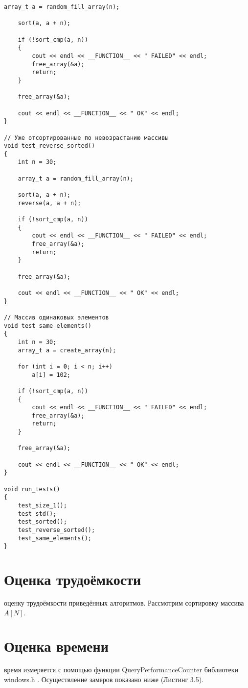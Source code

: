 \begin{lstlisting}[label=code, caption = Тесты]
	array_t a = random_fill_array(n);
	
	sort(a, a + n);
	
	if (!sort_cmp(a, n))
	{
		cout << endl << __FUNCTION__ << " FAILED" << endl;
		free_array(&a);
		return;
	}
	
	free_array(&a);
	
	cout << endl << __FUNCTION__ << " OK" << endl;
}

// Уже отсортированные по невозрастанию массивы
void test_reverse_sorted()
{
	int n = 30;
	
	array_t a = random_fill_array(n);
	
	sort(a, a + n);
	reverse(a, a + n);
	
	if (!sort_cmp(a, n))
	{
		cout << endl << __FUNCTION__ << " FAILED" << endl;
		free_array(&a);
		return;
	}
	
	free_array(&a);
	
	cout << endl << __FUNCTION__ << " OK" << endl;
}

// Массив одинаковых элементов
void test_same_elements()
{
	int n = 30;
	array_t a = create_array(n);
	
	for (int i = 0; i < n; i++)
		a[i] = 102;
	
	if (!sort_cmp(a, n))
	{
		cout << endl << __FUNCTION__ << " FAILED" << endl;
		free_array(&a);
		return;
	}
	
	free_array(&a);
	
	cout << endl << __FUNCTION__ << " OK" << endl;
}

void run_tests()
{
	test_size_1();
	test_std();
	test_sorted();
	test_reverse_sorted();
	test_same_elements();
}
\end{lstlisting}

\section{Оценка трудоёмкости}
 оценку трудоёмкости приведённых алгоритмов. Рассмотрим сортировку массива  $A[N]$.\\

\section{Оценка времени}
 время измеряется с помощью функции QueryPerformanceCounter библиотеки windows.h \cite{Query}. Осуществление замеров показано ниже (Листинг 3.5).
\begin{lstlisting}[label=code, caption = Замеры процессорного времени]
	
\end{lstlisting}